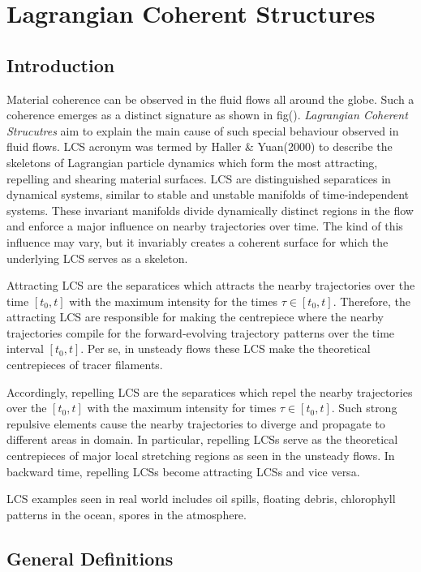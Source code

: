 \chapter{Lagrangian Coherent Structures}

\section{Introduction}
Material coherence can be observed in the fluid flows all around the globe. Such a coherence emerges as a distinct signature as shown in fig(). \textit{Lagrangian Coherent Strucutres} aim to explain the main cause of such special behaviour observed in fluid flows. LCS acronym was termed by Haller \& Yuan(2000) to describe the skeletons of Lagrangian particle dynamics which form the most attracting, repelling and shearing material surfaces. LCS are distinguished separatices in dynamical systems, similar to stable and unstable manifolds of time-independent systems. These invariant manifolds divide dynamically distinct regions in the flow and enforce a major influence on nearby trajectories over time. The kind of this influence may vary, but it invariably creates a coherent surface for which the underlying LCS serves as a skeleton.

Attracting LCS are the separatices which attracts the nearby trajectories over the time $ [t_{0}, t] $ with the maximum intensity for the times $ \tau \in [t_{0}, t] $. Therefore, the attracting LCS are responsible for making the centrepiece where the nearby trajectories compile for the forward-evolving trajectory patterns over the time interval $ [t_{0}, t] $.  Per se, in unsteady flows these LCS make the theoretical centrepieces of tracer filaments. 

Accordingly, repelling LCS are the separatices which repel the nearby trajectories over the $ [t_{0}, t] $ with the maximum intensity for times $ \tau \in [t_{0}, t] $. Such strong repulsive elements cause the nearby trajectories to diverge and propagate to different areas in domain. In particular, repelling LCSs serve as the theoretical centrepieces of major local stretching regions as seen in the unsteady flows. In backward time, repelling LCSs become attracting LCSs and vice versa.

LCS examples seen in real world includes oil spills, floating debris, chlorophyll patterns in the ocean, spores in the atmosphere. 

\section{General Definitions}

